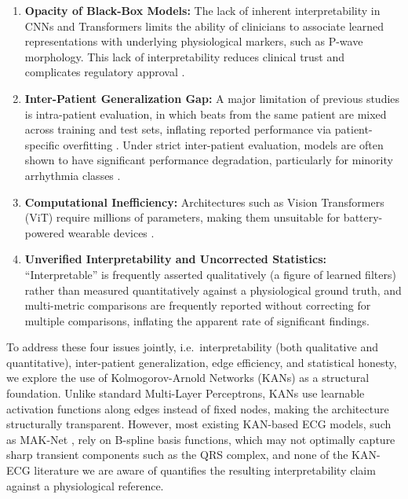 \documentclass[journal,twoside,web]{ieeecolor}
\begin{document}
\begin{enumerate}
    \item \textbf{Opacity of Black-Box Models:} The lack of inherent interpretability in CNNs and Transformers limits the ability of clinicians to associate learned representations with underlying physiological markers, such as P-wave morphology. This lack of interpretability reduces clinical trust and complicates regulatory approval \cite{taleban_explainable_2026}.
    \item \textbf{Inter-Patient Generalization Gap:} A major limitation of previous studies is intra-patient evaluation, in which beats from the same patient are mixed across training and test sets, inflating reported performance via patient-specific overfitting \cite{bahrami_investigation_2025}. Under strict inter-patient evaluation, models are often shown to have significant performance degradation, particularly for minority arrhythmia classes \cite{xiao_deep_2023, silva_systematic_2025}.
    \item \textbf{Computational Inefficiency:} Architectures such as Vision Transformers (ViT) require millions of parameters, making them unsuitable for battery-powered wearable devices \cite{elsheikhy_lightweight_2025}.
    \item \textbf{Unverified Interpretability and Uncorrected Statistics:} ``Interpretable'' is frequently asserted qualitatively (a figure of learned filters) rather than measured quantitatively against a physiological ground truth, and multi-metric comparisons are frequently reported without correcting for multiple comparisons, inflating the apparent rate of significant findings.
\end{enumerate}

To address these four issues jointly, i.e.\ interpretability (both qualitative and quantitative), inter-patient generalization, edge efficiency, and statistical honesty, we explore the use of Kolmogorov-Arnold Networks (KANs) \cite{liu_kan_2024} as a structural foundation. Unlike standard Multi-Layer Perceptrons, KANs use learnable activation functions along edges instead of fixed nodes, making the architecture structurally transparent. However, most existing KAN-based ECG models, such as MAK-Net \cite{zhao_mak-net_2025}, rely on B-spline basis functions, which may not optimally capture sharp transient components such as the QRS complex, and none of the KAN-ECG literature we are aware of quantifies the resulting interpretability claim against a physiological reference.
\end{document}
